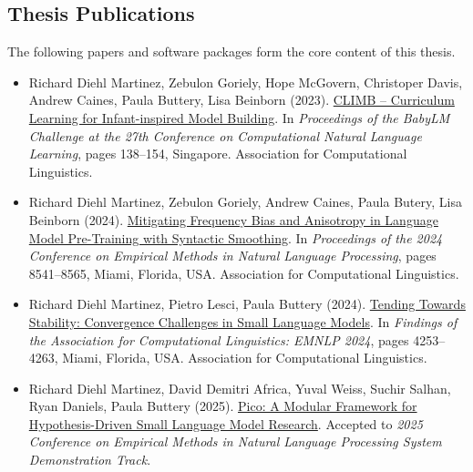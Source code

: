 \begin{tcolorbox}[
    enhanced,
    colback=white,
    colframe=thesisblue,
    arc=0mm,
    boxrule=1pt,
    left=10pt,
    right=10pt,
    top=10pt,
    bottom=10pt,
    title=Published Works,
    fonttitle=\bfseries,
    coltitle=white
]
\subsection*{Thesis Publications}
The following papers and software packages form the core content of this thesis.

\begin{itemize}
    \item Richard Diehl Martinez, Zebulon Goriely, Hope McGovern, Christoper Davis, Andrew Caines, Paula Buttery, Lisa Beinborn (2023). {\color{thesisblue}\href{https://aclanthology.org/2023.conll-1.10/}{CLIMB – Curriculum Learning for Infant-inspired Model Building}}. In \emph{Proceedings of the BabyLM Challenge at the 27th Conference on Computational Natural Language Learning}, pages 138--154, Singapore. Association for Computational Linguistics.

    \item Richard Diehl Martinez, Zebulon Goriely, Andrew Caines, Paula Butery, Lisa Beinborn (2024). {\color{thesisblue}\href{https://aclanthology.org/2024.emnlp-main.486/}{Mitigating Frequency Bias and Anisotropy in Language Model Pre-Training with Syntactic Smoothing}}. In \emph{Proceedings of the 2024 Conference on Empirical Methods in Natural Language Processing}, pages 8541--8565, Miami, Florida, USA. Association for Computational Linguistics.

    \item Richard Diehl Martinez, Pietro Lesci, Paula Buttery (2024). {\color{thesisblue}\href{https://aclanthology.org/2024.findings-emnlp.246/}{Tending Towards Stability: Convergence Challenges in Small Language Models}}. In \emph{Findings of the Association for Computational Linguistics: EMNLP 2024}, pages 4253--4263, Miami, Florida, USA. Association for Computational Linguistics.

    \item Richard Diehl Martinez, David Demitri Africa, Yuval Weiss, Suchir Salhan, Ryan Daniels, Paula Buttery (2025). {\color{thesisblue}\href{https://github.com/pico-lm}{Pico: A Modular Framework for Hypothesis-Driven Small Language Model Research}}. Accepted to \emph{2025 Conference on Empirical Methods in Natural Language Processing System Demonstration Track}.
\end{itemize}
\end{tcolorbox}


